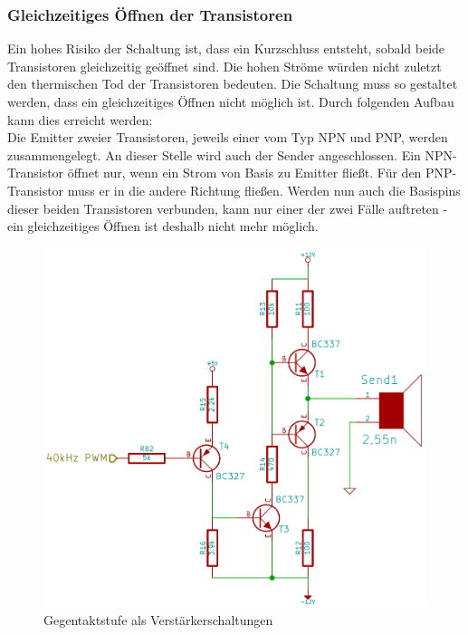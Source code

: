 \subsubsection{Gleichzeitiges Öffnen der Transistoren}
Ein hohes Risiko der Schaltung ist, dass ein Kurzschluss entsteht, sobald beide Transistoren gleichzeitig geöffnet sind. Die hohen Ströme würden nicht zuletzt den thermischen Tod der Transistoren bedeuten. Die Schaltung muss so gestaltet werden, dass ein gleichzeitiges Öffnen nicht möglich ist. Durch folgenden Aufbau kann dies erreicht werden:\\
Die Emitter zweier Transistoren, jeweils einer vom Typ NPN und PNP, werden zusammengelegt. An dieser Stelle wird auch der Sender angeschlossen. Ein NPN-Transistor öffnet nur, wenn ein Strom von Basis zu Emitter fließt. Für den PNP-Transistor muss er in die andere Richtung fließen. Werden nun auch die Basispins dieser beiden Transistoren verbunden, kann nur einer der zwei Fälle auftreten - ein gleichzeitiges Öffnen ist deshalb nicht mehr möglich.
\begin{figure}[H]
\centering
\includegraphics[scale=0.6]{images/push_pull.png}
\caption{Gegentaktstufe als Verstärkerschaltungen} \label{img:I5}
\end{figure}


